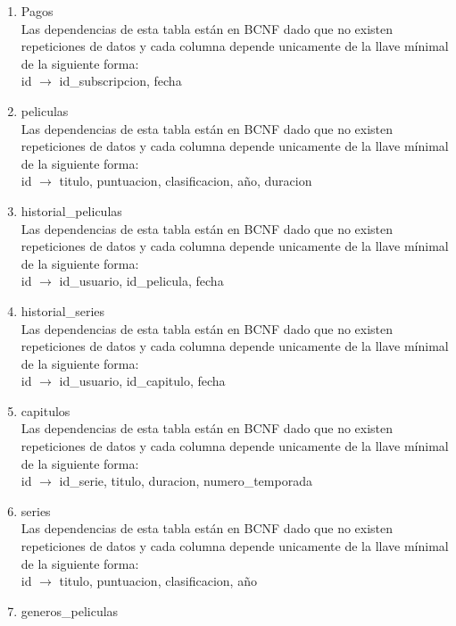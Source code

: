 \documentclass{article}
\begin{document}
\begin{enumerate}
    \item Pagos \\
    Las dependencias de esta tabla están en BCNF dado que no existen repeticiones de datos y cada columna depende unicamente de la llave mínimal de la siguiente forma: \\
    id $\rightarrow$ id\_subscripcion, fecha \\
    \item peliculas \\
    Las dependencias de esta tabla están en BCNF dado que no existen repeticiones de datos y cada columna depende unicamente de la llave mínimal de la siguiente forma: \\
    id $\rightarrow$ titulo, puntuacion, clasificacion, año, duracion \\
    \item historial\_peliculas \\
    Las dependencias de esta tabla están en BCNF dado que no existen repeticiones de datos y cada columna depende unicamente de la llave mínimal de la siguiente forma: \\
    id $\rightarrow$ id\_usuario, id\_pelicula, fecha \\
    \item historial\_series \\
    Las dependencias de esta tabla están en BCNF dado que no existen repeticiones de datos y cada columna depende unicamente de la llave mínimal de la siguiente forma: \\
    id $\rightarrow$ id\_usuario, id\_capitulo, fecha \\
    \item capitulos \\
    Las dependencias de esta tabla están en BCNF dado que no existen repeticiones de datos y cada columna depende unicamente de la llave mínimal de la siguiente forma: \\
    id $\rightarrow$ id\_serie, titulo, duracion, numero\_temporada \\
    \item series \\
    Las dependencias de esta tabla están en BCNF dado que no existen repeticiones de datos y cada columna depende unicamente de la llave mínimal de la siguiente forma: \\
    id $\rightarrow$ titulo, puntuacion, clasificacion, año \\
    \item generos\_peliculas \\

\end{enumerate}
\end{document}
